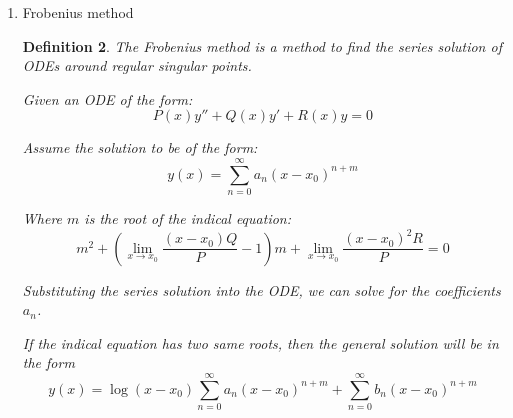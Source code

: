 \documentclass{article}
\newtheorem{definition}{Definition}[section]
\begin{document}
\begin{enumerate}
\begin{definition}
              If the quadraric eqation:
              \begin{equation}
                  m^2 + (a-1) m + b = 0
              \end{equation}
              has two distinct roots $m_1$ and $m_2$,
              then the general solution of the Euler equation is:
              \begin{equation}
                  y(x) = c_1 x^{m_1} + c_2 x^{m_2}
              \end{equation}

              If the quadratic equation has a single root $m$,
              then the general solution of the Euler equation is:
              \begin{equation}
                  y(x) = c_1 x^m + c_2 x^m \ln x
              \end{equation}
          \end{definition}
    \item Frobenius method
          \begin{definition}
              The Frobenius method is a method to find the series solution of ODEs around regular singular points.

              Given an ODE of the form:
              \begin{equation}
                  P(x) y'' + Q(x) y' + R(x) y = 0
              \end{equation}

              Assume the solution to be of the form:
              \begin{equation}
                  y(x) = \sum_{n=0}^{\infty} a_n (x - x_0)^{n+m}
              \end{equation}

              Where $m$ is the root of the indical equation:
              \begin{equation}
                  m^2 + (\lim_{x\rightarrow x_0}\frac{(x-x_{0})Q}{P}-1) m
                  + \lim_{x\rightarrow x_0}\frac{(x-x_{0})^2R}{P} = 0
              \end{equation}

              Substituting the series solution into the ODE,
              we can solve for the coefficients $a_n$.

              If the indical equation has two same roots,
              then the general solution will be in the form
              \begin{equation}
                  y(x) = \log(x-x_{0}) \sum_{n=0}^{\infty} a_n (x - x_0)^{n+m}
                  + \sum_{n=0}^{\infty} b_n (x - x_0)^{n+m}
              \end{equation}


\end{definition}
\end{enumerate}
\end{document}

